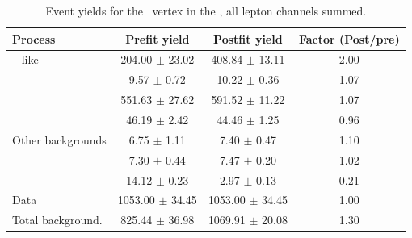 \begin{table}[htbp]
	\centering
		\caption{Event yields for the \Zut\ vertex in the \WZCR,   all lepton channels summed. }
	
	\begin{tabular} {l c c c }
		\toprule
		Process & Prefit yield & Postfit yield & Factor (Post/pre) \\
		\midrule
		\NPL\ \DY-like & 204.00 $ \pm $ 23.02 & 408.84 $ \pm $ 13.11 & 2.00 \\ 
		\ttZ & 9.57 $ \pm $ 0.72 & 10.22 $ \pm $ 0.36 & 1.07 \\ 
		\WZ & 551.63 $ \pm $ 27.62 & 591.52 $ \pm $ 11.22 & 1.07 \\ 
		\ZZ & 46.19 $ \pm $ 2.42 & 44.46 $ \pm $ 1.25 & 0.96 \\ 
		Other backgrounds & 6.75 $ \pm $ 1.11 & 7.40 $ \pm $ 0.47 & 1.10 \\ 
		\tZq & 7.30 $ \pm $ 0.44 & 7.47 $ \pm $ 0.20 & 1.02 \\ 
		\kZut  & 14.12 $ \pm $ 0.23 & 2.97 $ \pm $ 0.13 & 0.21 \B \\
		\hdashline
		Data & 1053.00 $ \pm $ 34.45 & 1053.00 $ \pm $ 34.45 & 1.00 \T \\
		Total background. & 825.44 $ \pm $ 36.98 & 1069.91 $ \pm $ 20.08 & 1.30\\
		\bottomrule
	\end{tabular}
\end{table}
